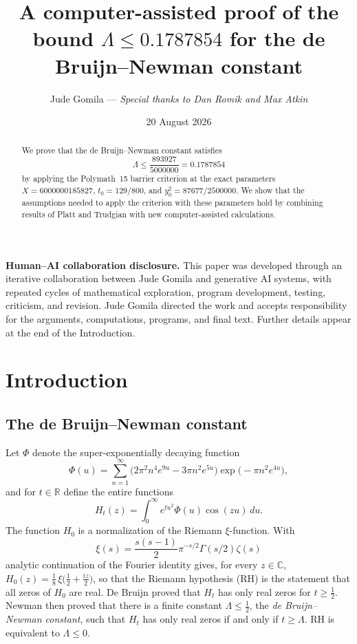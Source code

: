 \documentclass[11pt]{article}
\title{A computer-assisted proof of the bound
$\Lambda\le 0.1787854$ for the de Bruijn--Newman constant}
\author{Jude Gomila \textnormal{---}
{\small\textnormal{\emph{Special thanks to Dan Romik and Max Atkin}}}}
\date{20 August 2026}
\theoremstyle{definition}
\newcommand{\LB}{\Lambda}
\newcommand{\R}{\mathbb{R}}
\newcommand{\C}{\mathbb{C}}
\begin{document}
\maketitle

\begin{abstract}
\noindent We prove that the de Bruijn--Newman constant satisfies
\[
\LB\le\frac{893927}{5000000}=0.1787854
\]
by applying the Polymath~15 barrier criterion at the exact parameters
$X=6000000185827$, $t_0=129/800$, and
$y_0^2=87677/2500000$. We show that the assumptions needed to apply the
criterion with these parameters hold by combining results of Platt and
Trudgian with new computer-assisted calculations.
\end{abstract}

\begin{center}
\begin{minipage}{0.88\textwidth}
\begin{framed}
\small
\raggedright
\noindent\textbf{Human--AI collaboration disclosure.}
This paper was developed through an iterative collaboration between Jude
Gomila and generative AI systems, with repeated cycles of mathematical
exploration, program development, testing, criticism, and revision. Jude
Gomila directed the work and accepts responsibility for the arguments,
computations, programs, and final text. Further details appear at the end of
the Introduction.
\end{framed}
\end{minipage}
\end{center}

\section{Introduction}

\subsection{The de Bruijn--Newman constant}

Let $\Phi$ denote the super-exponentially decaying function
\[
\Phi(u)=\sum_{n=1}^{\infty}
\bigl(2\pi^2n^4e^{9u}-3\pi n^2e^{5u}\bigr)
\exp\!\bigl(-\pi n^2e^{4u}\bigr),
\]
and for $t\in\R$ define the entire functions
\begin{equation}\label{eq:Ht}
H_t(z)=\int_0^\infty e^{tu^2}\Phi(u)\cos(zu)\,du .
\end{equation}
The function $H_0$ is a normalization of the Riemann $\xi$-function. With
\[
\xi(s)=\frac{s(s-1)}{2}\pi^{-s/2}\Gamma(s/2)\zeta(s)
\]
analytic continuation of the Fourier identity gives, for every $z\in\C$,
$H_0(z)=\frac18\,\xi\!\bigl(\frac12+\frac{iz}2\bigr)$, so that the
Riemann hypothesis (RH) is the statement that all zeros of $H_0$ are
real. De Bruijn \cite{deBruijn} proved that $H_t$ has only real zeros for
$t\ge\frac12$. Newman \cite{Newman} then proved that there is a finite
constant $\LB\le\frac12$, the \emph{de Bruijn--Newman constant}, such that
$H_t$ has only real zeros if and only if $t\ge\LB$. RH is equivalent to
$\LB\le0$.
\end{document}
